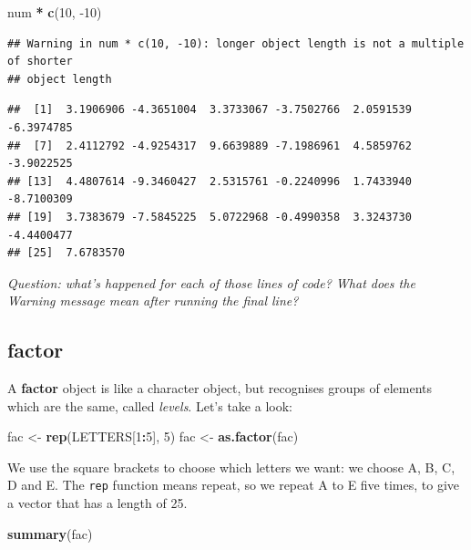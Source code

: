 \documentclass[
]{book}
\newenvironment{Shaded}{\begin{snugshade}}{\end{snugshade}}
\newcommand{\DecValTok}[1]{\textcolor[rgb]{0.00,0.00,0.81}{#1}}
\newcommand{\KeywordTok}[1]{\textcolor[rgb]{0.13,0.29,0.53}{\textbf{#1}}}
\newcommand{\NormalTok}[1]{#1}
\newcommand{\OperatorTok}[1]{\textcolor[rgb]{0.81,0.36,0.00}{\textbf{#1}}}
\newcommand{\StringTok}[1]{\textcolor[rgb]{0.31,0.60,0.02}{#1}}
\begin{document}
\begin{Shaded}
\begin{Highlighting}[]
\NormalTok{num }\OperatorTok{*}\StringTok{ }\KeywordTok{c}\NormalTok{(}\DecValTok{10}\NormalTok{, }\DecValTok{-10}\NormalTok{)}
\end{Highlighting}
\end{Shaded}

\begin{verbatim}
## Warning in num * c(10, -10): longer object length is not a multiple of shorter
## object length
\end{verbatim}

\begin{verbatim}
##  [1]  3.1906906 -4.3651004  3.3733067 -3.7502766  2.0591539 -6.3974785
##  [7]  2.4112792 -4.9254317  9.6639889 -7.1986961  4.5859762 -3.9022525
## [13]  4.4807614 -9.3460427  2.5315761 -0.2240996  1.7433940 -8.7100309
## [19]  3.7383679 -7.5845225  5.0722968 -0.4990358  3.3243730 -4.4400477
## [25]  7.6783570
\end{verbatim}

\emph{Question: what's happened for each of those lines of code? What does the Warning
message mean after running the final line?}\\
\hspace*{0.333em}

\hypertarget{factor}{%
\subsection{factor}\label{factor}}

A \textbf{factor} object is like a character object, but recognises groups of elements
which are the same, called \emph{levels}. Let's take a look:

\begin{Shaded}
\begin{Highlighting}[]
\NormalTok{fac <-}\StringTok{ }\KeywordTok{rep}\NormalTok{(LETTERS[}\DecValTok{1}\OperatorTok{:}\DecValTok{5}\NormalTok{], }\DecValTok{5}\NormalTok{)}
\NormalTok{fac <-}\StringTok{ }\KeywordTok{as.factor}\NormalTok{(fac)}
\end{Highlighting}
\end{Shaded}

We use the square brackets to choose which letters we
want: we choose A, B, C, D and E. The \texttt{rep} function means repeat, so we
repeat A to E five times, to give a vector that has a length of 25.

\begin{Shaded}
\begin{Highlighting}[]
\KeywordTok{summary}\NormalTok{(fac)}
\end{Highlighting}
\end{Shaded}
\end{document}
